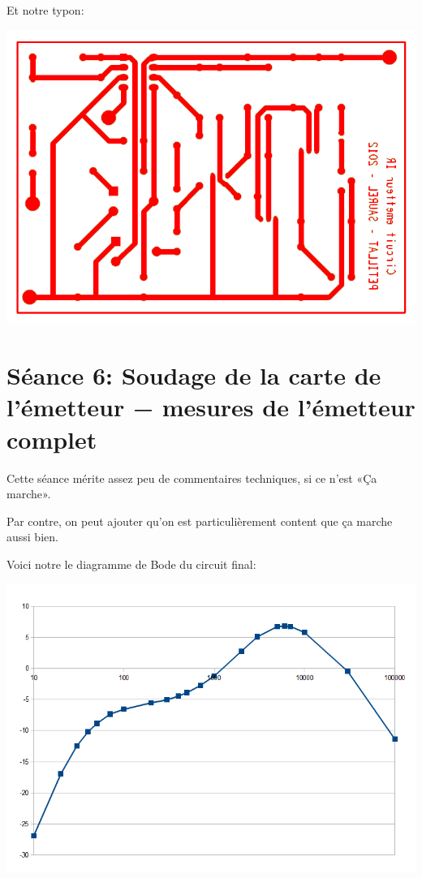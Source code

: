 Et notre typon:

\includegraphics[width=\linewidth]{../img/routage.png}

\section{Séance 6: Soudage de la carte de l’émetteur − mesures de l’émetteur complet}
Cette séance mérite assez peu de commentaires techniques, si ce n’est «Ça marche».

Par contre, on peut ajouter qu’on est particulièrement content que ça marche aussi bien.

Voici notre le diagramme de Bode du circuit final:

\includegraphics[width=\linewidth]{../img/bode_circuit_audio_labdec.png}

